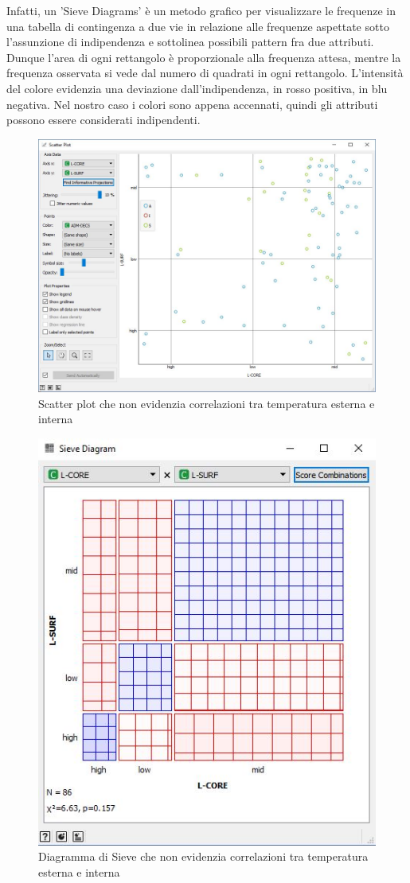 \documentclass[a4paper, 12p]{report}
\begin{document}
Infatti, un 'Sieve Diagrams' è un metodo grafico per visualizzare le frequenze in una tabella di contingenza a due vie in relazione alle frequenze aspettate sotto l'assunzione di indipendenza e sottolinea possibili pattern fra due attributi. Dunque l’area di ogni rettangolo è proporzionale alla frequenza attesa,  mentre la frequenza osservata si vede dal numero di quadrati in ogni rettangolo. L'intensità del colore evidenzia una deviazione dall'indipendenza, in rosso positiva, in blu negativa. Nel nostro caso i colori sono appena accennati, quindi gli attributi possono essere considerati indipendenti.
\begin{figure}	
	\centering
	\includegraphics[scale = 0.5]{img/ScatterJPG.JPG}
	\caption{Scatter plot che non evidenzia correlazioni tra temperatura esterna e interna }\label{fig:4}
\end{figure}
\begin{figure}	
	\centering
	\includegraphics[scale = 0.6]{img/Sieve.JPG}
	\caption{Diagramma di Sieve che non evidenzia correlazioni tra temperatura esterna e interna }\label{fig:5}
\end{figure}
\end{document}

